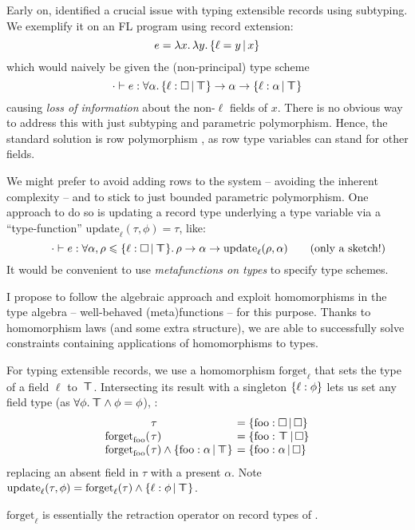 Early on, \textcite{operations-on-records} identified a crucial issue with typing extensible records using subtyping. We exemplify it on an FL program using record extension:
$$ e = \fllam x \fllam y \flext{\ell = y}{x} $$
which would naively be given the (non-principal) type scheme
$$ \cdot \vdash e : \forall \alpha \ldotp \flext{\ell : \flabsent}{\flftop} \to \alpha \to \flext{\ell : \alpha}{\flftop} $$
causing \emph{loss of information} about the non-$\ell$ fields of $x$. There is no obvious way to address this with just subtyping and parametric polymorphism. Hence, the standard solution is row polymorphism \cite{remy-records}, as row type variables can stand for other fields. 

We might prefer to avoid adding rows to the system -- avoiding the inherent complexity -- and to stick to just bounded parametric polymorphism. One approach to do so is updating a record type underlying a type variable via a \enquote{type-function} $\mathrm{update}_\ell(\tau, \phi) = \tau$, like:
$$ \qquad \cdot \vdash e : \forall \alpha, \rho \sub \flext{\ell : \flabsent}{\flftop} \ldotp \rho \to \alpha \to \mathrm{update}_\ell(\rho, \alpha) \qquad \text{(only a sketch!)} $$
It would be convenient to use \emph{metafunctions on types} to specify type schemes.

I propose to follow the algebraic approach and exploit homomorphisms in the type algebra -- well-behaved (meta)functions -- for this purpose. Thanks to homomorphism laws (and some extra structure), we are able to successfully solve constraints containing applications of homomorphisms to types.
\begin{example}
    For typing extensible records, we use a homomorphism $\mathrm{forget}_\ell$ that sets the type of a field $\ell$ to~$\top \!\!\!\! \top$.
    Intersecting its result with a singleton $\flrec{\ell : \phi}$ lets us set any field type (as $\forall \phi \ldotp \top \!\!\!\! \top \land \phi = \phi$), \eg{}:
    \setlength{\tabcolsep}{0pt}
    $$\begin{array}{rll}
        &\hspace{-0.9em}\tau &\;\hspace{-0.9em}= \flext{\mathrm{foo}: \flabsent}{\flabsent} \\
        \mathrm{forget}_\mathrm{foo}( &\hspace{-0.9em}\tau ) &\;\hspace{-0.9em}= \flext{\mathrm{foo}: \flftop}{\flabsent} \\
        \mathrm{forget}_\mathrm{foo}( &\hspace{-0.9em}\tau ) \meet \flext{\mathrm{foo}: \alpha}{\flftop} &\;\hspace{-0.9em}= \flext{\mathrm{foo}: \alpha}{\flabsent}
    \end{array}$$
    replacing an absent field in $\tau$ with a present $\alpha$. Note $\mathrm{update}_\ell(\tau, \phi) = \mathrm{forget}_\ell(\tau) \meet \flext{ \ell : \phi }{\flftop}$.

    $\mathrm{forget}_\ell$ is essentially the retraction operator on record types of \textcite{operations-on-records}.
\end{example}

